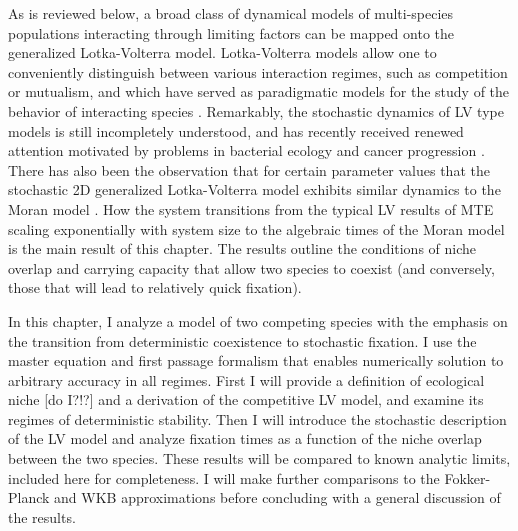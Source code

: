 As is reviewed below, a broad class of dynamical models of multi-species populations interacting through limiting factors can be mapped onto the generalized Lotka-Volterra model. 
Lotka-Volterra models allow one to conveniently distinguish between various interaction regimes, such as competition or mutualism, and which have served as paradigmatic models for the study of the behavior of interacting species \cite{Volterra1926,Bomze1983,Chesson1990,Antal2006,Chotibut2015,Dobrinevski2012,Fisher2014,Constable2015,Lin2012,Gabel2013,Kessler2015,Young2018}. 
Remarkably, the stochastic dynamics of LV type models is still incompletely understood, and has recently received renewed attention motivated by problems in bacterial ecology and cancer progression \cite{VanMelderen2009,Stirk2010,Fisher2014,Chotibut2015,Capitan2017,Kessler2014}. %
There has also been the observation that for certain parameter values that the stochastic 2D generalized Lotka-Volterra model exhibits similar dynamics to the Moran model \cite{Lin2012,Constable2015,Chotibut2015,Young2018}. 
How the system transitions from the typical LV results of MTE scaling exponentially with system size to the algebraic times of the Moran model is the main result of this chapter. 
The results outline the conditions of niche overlap and carrying capacity that allow two species to coexist (and conversely, those that will lead to relatively quick fixation). 

In this chapter, I analyze a model of two competing species with the emphasis on the transition from deterministic coexistence to stochastic fixation. %
I use the master equation and first passage formalism that enables numerically solution to arbitrary accuracy in all regimes. %
First I will provide a definition of ecological niche [do I?!?] and a derivation of the competitive LV model, and examine its regimes of deterministic stability. %
Then I will introduce the stochastic description of the LV model and analyze fixation times as a function of the niche overlap between the two species. 
These results will be compared to known analytic limits, included here for completeness. 
I will make further comparisons to the Fokker-Planck and WKB approximations before concluding with a general discussion of the results. 


